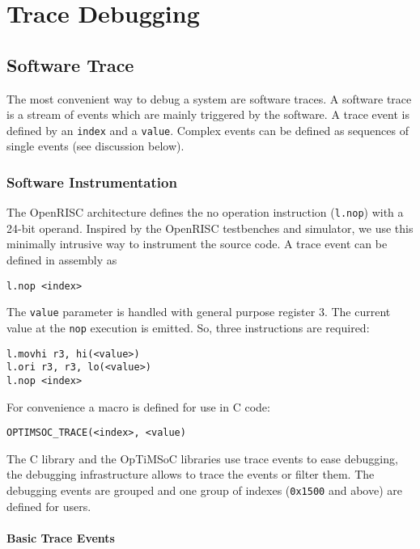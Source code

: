 \chapter{Trace Debugging}

\section{Software Trace}

The most convenient way to debug a system are software traces. A
software trace is a stream of events which are mainly triggered by the
software. A trace event is defined by an \verb|index| and a
\verb|value|. Complex events can be defined as sequences of single
events (see discussion below).

\subsection{Software Instrumentation}

The OpenRISC architecture defines the no operation instruction
(\verb|l.nop|) with a 24-bit operand. Inspired by the OpenRISC
testbenches and simulator, we use this minimally intrusive way to
instrument the source code. A trace event can be defined in assembly
as

\begin{lstlisting}
l.nop <index>
\end{lstlisting}

The \verb|value| parameter is handled with general purpose register 3.
The current value at the \verb|nop| execution is emitted. So, three
instructions are required:

\begin{lstlisting}
l.movhi r3, hi(<value>)
l.ori r3, r3, lo(<value>)
l.nop <index>
\end{lstlisting}

For convenience a macro is defined for use in C code:

\begin{lstlisting}
OPTIMSOC_TRACE(<index>, <value)
\end{lstlisting}

The C library and the OpTiMSoC libraries use trace events to ease
debugging, the debugging infrastructure allows to trace the events or
filter them. The debugging events are grouped and one group of indexes
(\verb|0x1500| and above) are defined for users.

\subsubsection{Basic Trace Events}

